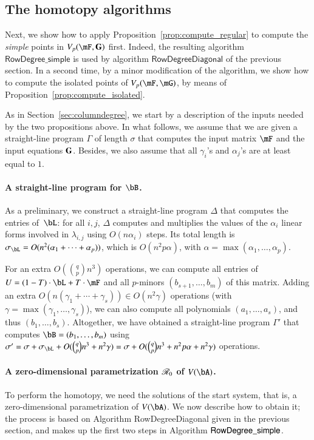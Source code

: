 \documentclass[amsthm]{elsart}
\begin{document}

\subsection{The homotopy algorithms}

Next, we show how to apply Proposition~\ref{prop:compute_regular} to
compute the {\em simple} points in $\VpFG{p}{\mF}{\G}$ first. Indeed, the
resulting algorithm $\mathsf{RowDegree\_simple}$ is used by algorithm
$\mathsf{RowDegreeDiagonal}$ of the previous section. In a second
time, by a minor modification of the algorithm, we show how to compute
the isolated points of $\VpFG{p}{\mF}{\mG}$, by means of
Proposition~\ref{prop:compute_isolated}.

As in Section~\ref{sec:columndegree}, we start by a description of the
inputs needed by the two propositions above. In what follows, we
assume that we are given a straight-line program $\Gamma$ of length
$\sigma$ that computes the input matrix $\mF$ and the input equations
$\mathbf{G}$.  Besides, we also assume that all $\gamma_i$'s and $\alpha_j$'s
are at least equal to $1$.

\paragraph*{A straight-line program for $\bB$.} 
As a preliminary, we construct a straight-line program $\Delta$ that
computes the entries of~$\bL$: for all $i,j$, $\Delta$ computes and
multiplies the values of the $\alpha_i$ linear forms involved in
$\lambda_{i,j}$ using $O(n \alpha_i)$ steps. Its total length is
$\sigma_\bL=O(n^2 (\alpha_1+\cdots+\alpha_p))$, which is $O(n^2 p
\alpha)$, with $\alpha = \max(\alpha_1, \ldots, \alpha_p)$.

For an extra $O({q \choose p} n^3)$ operations, we can compute all
entries of $\mU=(1-T)\cdot\bL+T\cdot\mF$ and all $p$-minors
$(b_{s+1},\dots,b_m)$ of this matrix.  Adding an extra $O(n(\gamma_1 +
\cdots + \gamma_s))\in O(n^2 \gamma)$ operations (with $\gamma =
\max(\gamma_1, \ldots, \gamma_s)$), we can also compute all
polynomials $(a_1,\dots,a_s)$, and thus $(b_1,\dots,b_s)$.
Altogether, we have obtained a straight-line program $\Gamma'$ that
computes $\bB=(b_1,\dots,b_m)$ using $\sigma'=\sigma + \sigma_\bL +
O({q \choose p} n^3 + n^2 \gamma)=\sigma +O( {q \choose p} n^3 + n^2 p
\alpha+ n^2\gamma)$ operations.

\paragraph*{A zero-dimensional parametrization $\mathscr{R}_0$ of $V(\bA)$.} 
To perform the homotopy, we need the solutions of the start system,
that is, a zero-dimensional parametrization of $V(\bA)$. We now
describe how to obtain it; the process is based on Algorithm {\sf
  RowDegreeDiagonal} given in the previous section, and makes up the
first two steps in Algorithm ${\sf RowDegree\_simple}$.
\end{document}
